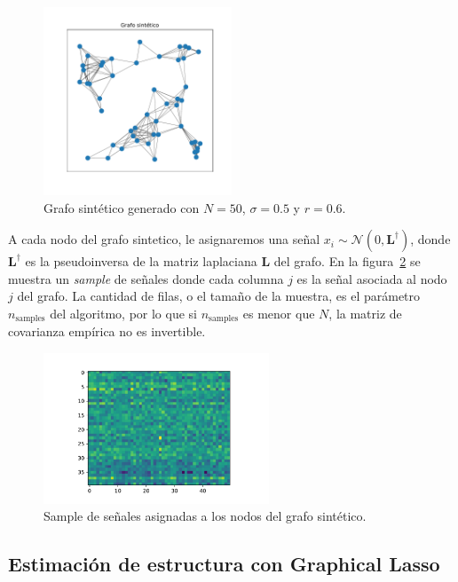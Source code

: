 \documentclass{article}
\begin{document}
\begin{figure}[htb]
    \centering
    \includegraphics[width=0.5\textwidth]{imagenes/grafo_sintetico.pdf}
    \caption{Grafo sintético generado con $N=50$, $\sigma=0.5$ y $r=0.6$.}
    \label{fig:grafo_sintetico}
\end{figure}

A cada nodo del grafo sintetico, le asignaremos una señal $x_i \sim \mathcal{N}(0, \mathbf{L}^\dagger)$, donde $\mathbf{L}^\dagger$ es la pseudoinversa de la matriz laplaciana $\mathbf{L}$ del grafo. En la figura~\ref{fig:signals_X_pseudoinverse} se muestra un \textit{sample} de señales
donde cada columna $j$ es la señal asociada al nodo $j$ del grafo. La cantidad de filas, o el tamaño de la muestra, es el parámetro $n_{\text{samples}}$ del algoritmo, por lo que si $n_{\text{samples}}$ es menor que $N$, la matriz de covarianza empírica no es invertible.

\begin{figure}[htb]
    \centering
    \includegraphics[width=0.6\textwidth]{imagenes/signals_X_pseudoinverse.pdf}
    \caption{Sample de señales asignadas a los nodos del grafo sintético.}
    \label{fig:signals_X_pseudoinverse}
\end{figure}

\subsection{Estimación de estructura con Graphical Lasso}
\end{document}
